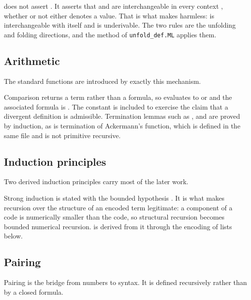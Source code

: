 \noindent
{} does not assert .  It asserts that  and 
are interchangeable in every context , whether or not either denotes a
value.  That is what makes  harmless:  is
interchangeable with itself and  is underivable.  The two rules
are the unfolding and folding directions, and the  method of
\texttt{unfold\_def.ML} applies them.

\subsection{Arithmetic}

The standard functions are introduced by exactly this mechanism.


\noindent
Comparison returns a term rather than a formula, so  evaluates to
 or  and the associated formula is .  The constant
 is included to exercise the claim that a divergent definition is
admissible.  Termination lemmas such as ,
 and  are proved by induction, as is
termination of Ackermann's function, which is defined in the same file and is
not primitive recursive.

\subsection{Induction principles}

Two derived induction principles carry most of the later work.


\noindent
Strong induction is stated with the bounded hypothesis .  It is
what makes recursion over the structure of an encoded term legitimate: a
component of a code is numerically smaller than the code, so structural
recursion becomes bounded numerical recursion.   is derived
from it through the encoding of lists below.

\subsection{Pairing}
\label{sec:cpair}

Pairing is the bridge from numbers to syntax.  It is defined recursively rather
than by a closed formula.

